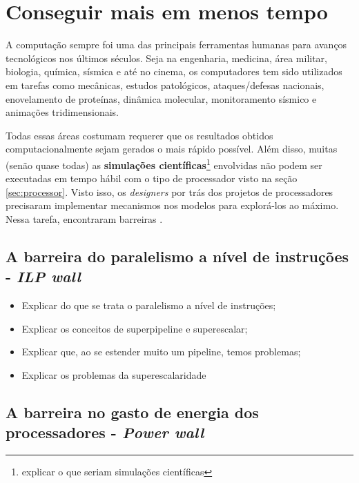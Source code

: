 \section{Conseguir mais em menos tempo}

	A computação sempre foi uma das principais ferramentas humanas para avanços 
	tecnológicos nos últimos séculos. Seja na engenharia, medicina, área 
	militar, biologia, química, sísmica e até no cinema, os computadores tem 
	sido utilizados em tarefas como mecânicas, estudos patológicos, 
	ataques/defesas nacionais, enovelamento de proteínas, dinâmica molecular, 
	monitoramento sísmico e animações tridimensionais.
	
	Todas essas áreas costumam requerer que os resultados obtidos 
	computacionalmente sejam gerados o mais rápido possível. Além disso, 
	muitas (senão quase todas) as \textbf{simulações científicas}\footnote{
		explicar o que seriam simulações científicas}
	envolvidas não podem ser executadas em tempo hábil com o tipo de processador
	visto na seção \ref{sec:processor}. Visto 
	isso, os \textit{designers} por trás dos projetos de processadores precisaram 
	implementar mecanismos nos modelos para explorá-los ao máximo. Nessa tarefa, 
	encontraram barreiras \cite{}.
    
    \subsection{A barreira do paralelismo a nível de instruções - \textit{ILP wall}}
    
    	
    
        \begin{itemize}
            \item Explicar do que se trata o paralelismo a nível de instruções;
            \item Explicar os conceitos de superpipeline e superescalar;
            \item Explicar que, ao se estender muito um pipeline, temos problemas;
            \item Explicar os problemas da superescalaridade
        \end{itemize}
    
    \subsection{A barreira no gasto de energia dos processadores - \textit{Power wall}}
    
